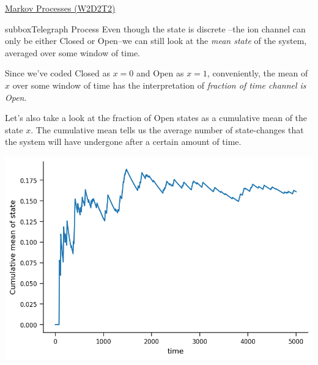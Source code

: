 \begin{textbox}{\href{https://colab.research.google.com/github/NeuromatchAcademy/course-content/blob/master/tutorials/W2D2_LinearSystems/student/W2D2_Tutorial2.ipynb}{Markov Processes (W2D2T2)} }
\begin{subbox}{subbox}{Telegraph Process}
Even though the state is discrete --the ion channel can only be either Closed or Open--we can still look at the \textit{mean state} of the system, averaged over some window of time. 

Since we've coded Closed as $x=0$ and Open as $x=1$, conveniently, the mean of $x$ over some window of time has the interpretation of \textit{fraction of time channel is Open}.

Let's also take a look at the fraction of Open states as a cumulative mean of the state $x$. The cumulative mean tells us the average number of state-changes that the system will have undergone after a certain amount of time. 

\begin{center}
\includegraphics[scale=0.32]{Figures/LS/MC_Figure4.png}
\end{center}
\end{subbox}
\end{textbox}
